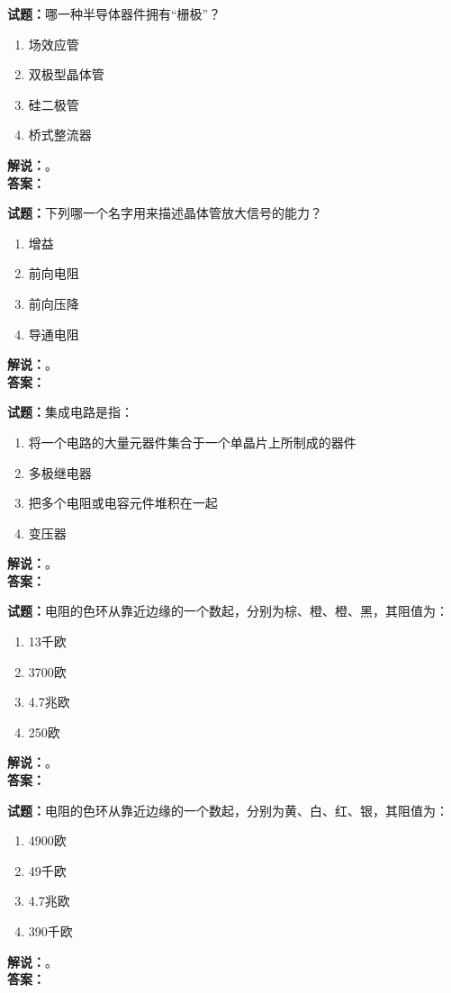 \documentclass{ctexbook}
\begin{document}
\bigskip

\noindent\textbf{试题：}哪一种半导体器件拥有“栅极”？
\begin{enumerate}[leftmargin=3em]
  \item 场效应管
  \item 双极型晶体管
  \item 硅二极管
  \item 桥式整流器
\end{enumerate}
\noindent\textbf{解说：}\textbf{}。\\\noindent\textbf{答案：}

\bigskip

\noindent\textbf{试题：}下列哪一个名字用来描述晶体管放大信号的能力？
\begin{enumerate}[leftmargin=3em]
  \item 增益
  \item 前向电阻
  \item 前向压降
  \item 导通电阻
\end{enumerate}
\noindent\textbf{解说：}\textbf{}。\\\noindent\textbf{答案：}

\bigskip

\noindent\textbf{试题：}集成电路是指：
\begin{enumerate}[leftmargin=3em]
  \item 将一个电路的大量元器件集合于一个单晶片上所制成的器件
  \item 多极继电器
  \item 把多个电阻或电容元件堆积在一起
  \item 变压器
\end{enumerate}
\noindent\textbf{解说：}\textbf{}。\\\noindent\textbf{答案：}

\bigskip

\noindent\textbf{试题：}电阻的色环从靠近边缘的一个数起，分别为棕、橙、橙、黑，其阻值为：
\begin{enumerate}[leftmargin=3em]
  \item 13千欧
  \item 3700欧
  \item 4.7兆欧
  \item 250欧
\end{enumerate}
\noindent\textbf{解说：}\textbf{}。\\\noindent\textbf{答案：}

\bigskip

\noindent\textbf{试题：}电阻的色环从靠近边缘的一个数起，分别为黄、白、红、银，其阻值为：
\begin{enumerate}[leftmargin=3em]
  \item 4900欧
  \item 49千欧
  \item 4.7兆欧
  \item 390千欧
\end{enumerate}
\noindent\textbf{解说：}\textbf{}。\\\noindent\textbf{答案：}
\end{document}
